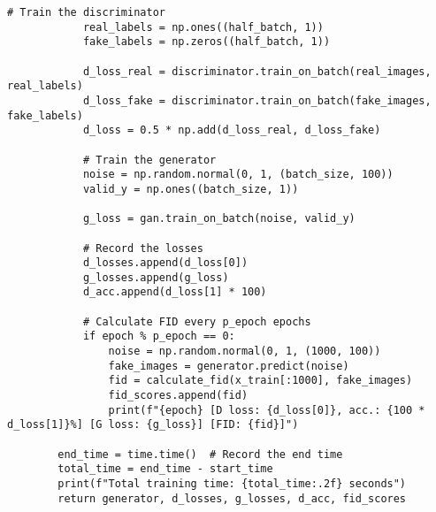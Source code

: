 \begin{lstlisting}[style=mypython, caption= {Explore GAN with 4 Convolutional Layers in Generator \\ and 3 Convolutional Layers in Discriminator}]
            # Train the discriminator
            real_labels = np.ones((half_batch, 1))
            fake_labels = np.zeros((half_batch, 1))
    
            d_loss_real = discriminator.train_on_batch(real_images, real_labels)
            d_loss_fake = discriminator.train_on_batch(fake_images, fake_labels)
            d_loss = 0.5 * np.add(d_loss_real, d_loss_fake)
    
            # Train the generator
            noise = np.random.normal(0, 1, (batch_size, 100))
            valid_y = np.ones((batch_size, 1))
    
            g_loss = gan.train_on_batch(noise, valid_y)
    
            # Record the losses
            d_losses.append(d_loss[0])
            g_losses.append(g_loss)
            d_acc.append(d_loss[1] * 100)
            
            # Calculate FID every p_epoch epochs
            if epoch % p_epoch == 0:
                noise = np.random.normal(0, 1, (1000, 100))
                fake_images = generator.predict(noise)
                fid = calculate_fid(x_train[:1000], fake_images)
                fid_scores.append(fid)
                print(f"{epoch} [D loss: {d_loss[0]}, acc.: {100 * d_loss[1]}%] [G loss: {g_loss}] [FID: {fid}]")
    
        end_time = time.time()  # Record the end time
        total_time = end_time - start_time
        print(f"Total training time: {total_time:.2f} seconds")
        return generator, d_losses, g_losses, d_acc, fid_scores
\end{lstlisting}

